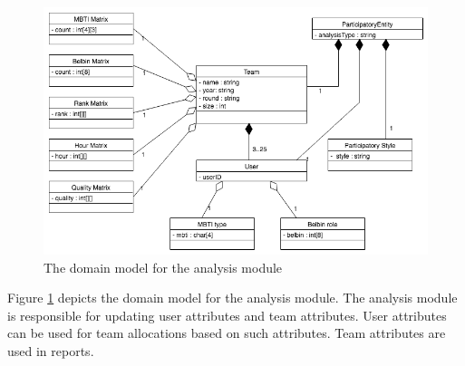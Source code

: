 \begin{figure}[htb]
\begin{center}
  \includegraphics[width=\textwidth,keepaspectratio=true]{analysisDomainModel}
\end{center}
\caption{ The domain model for the analysis module \label{fig:analysis_domainModel}}
\end{figure}

Figure \ref{fig:analysis_domainModel} depicts the domain model for the analysis module. The analysis module is responsible for updating user attributes and team attributes. User attributes can be used for team allocations based on such attributes. Team attributes are used in reports.


